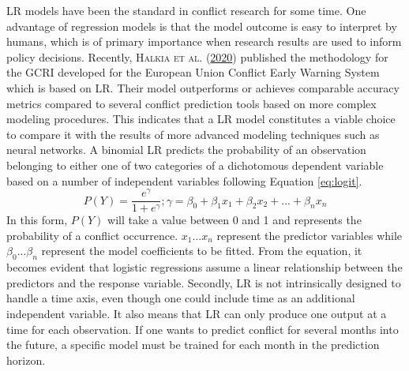 \documentclass[a4paper,11pt]{article}
\begin{document}
LR models have been the standard in conflict research for some time.
One advantage of regression models is that the model outcome is easy to interpret
by humans, which is of primary importance when research results are used
to inform policy decisions. Recently, \textsc{\textnormal{Halkia} \textnormal{et al.}} \textsc{(\textnormal{\protect\hyperlink{ref-halkia2020a}{2020}})} published the methodology for
the GCRI developed for the European Union Conflict Early Warning
System which is based on LR. Their model outperforms or achieves
comparable accuracy metrics compared to several conflict prediction tools
based on more complex modeling procedures. This indicates that a LR
model constitutes a viable choice to compare it with the results of more
advanced modeling techniques such as neural networks.
A binomial LR predicts the probability of an observation belonging to
either one of two categories of a dichotomous dependent variable based on a number
of independent variables following Equation \eqref{eq:logit}.
\begin{equation}
P(Y) = \frac{e^\gamma}{1+e^\gamma}; \gamma = \beta_0 + \beta_1x_1 + \beta_2x_2 + ... +\beta_nx_n
\label{eq:logit}
\end{equation}
In this form, \(P(Y)\) will take a value between 0 and 1 and represents the probability
of a conflict occurrence. \(x_1 ... x_n\) represent the predictor variables while
\(\beta_0 ... \beta_n\) represent the model coefficients to be fitted.
From the equation, it becomes evident that logistic regressions assume a linear
relationship between the predictors and the response variable. Secondly,
LR is not intrinsically designed to handle a time axis, even though
one could include time as an additional independent variable. It also means that
LR can only produce one output at a time for each observation.
If one wants to predict conflict for several months into the future, a specific model
must be trained for each month in the prediction horizon.
\end{document}
